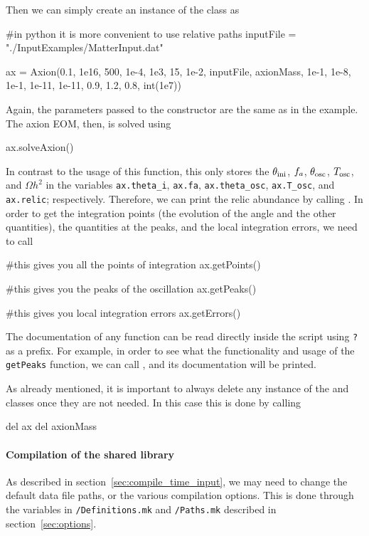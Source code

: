 \documentclass[11pt,a4paper]{article}
\begin{document}
Then we can simply create an instance of the  class as 
%
\begin{py}
	#in python it is more convenient to use relative paths
	inputFile = "./InputExamples/MatterInput.dat"  
	
	ax = Axion(0.1, 1e16, 500, 1e-4, 1e3, 15, 1e-2, inputFile, axionMass, 
					1e-1, 1e-8, 1e-1, 1e-11, 1e-11, 0.9, 1.2, 0.8, int(1e7))
\end{py}
%
Again, the parameters passed to the constructor are the same as in the \CPP example. The axion EOM, then, is solved using
%
\begin{py}
	ax.solveAxion()
\end{py}
%
In contrast to the \CPP usage of this function, this only stores the $\theta_{\rm ini}{}$, $f_{a}{}$, $\theta_{\rm osc}{}$, $T_{\rm osc}{}$, and $\Omega h^2$ in the variables {\tt ax.theta\_i}, {\tt ax.fa}, {\tt ax.theta\_osc}, {\tt ax.T\_osc}, and {\tt ax.relic}; respectively. Therefore, we can print the relic abundance by calling . In order to get the integration points (\ie the evolution of the angle and the other quantities), the quantities at the  peaks, and the local integration errors, we need to call
%
\begin{py}
	#this gives you all the points of integration
	ax.getPoints()
	
	#this gives you the peaks of the oscillation
	ax.getPeaks()
	
	#this gives you local integration errors
	ax.getErrors()
\end{py}
%
The documentation of any \PY function can be read directly inside the script using {\tt ?} as a prefix. For example, in order to see what the functionality and usage of the {\tt getPeaks} function, we can call , and its documentation will be printed. 

As already mentioned, it is important to always delete any instance of the  and  classes once they are not needed. In this case this is done by calling
%
\begin{py}
	del ax
	del axionMass
\end{py}


\paragraph{Compilation of the shared library}
%
As described in section~\ref{sec:compile_time_input}, we may need to change the default data file paths, or the various compilation options. This is done through the variables in {\tt \mimes/Definitions.mk} and {\tt \mimes/Paths.mk} described in section~\ref{sec:options}. 
\end{document}

